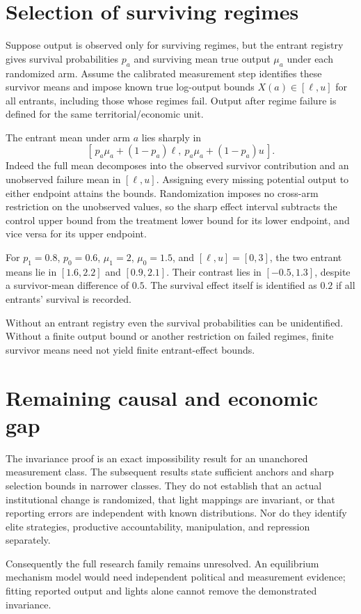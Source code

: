 \documentclass[11pt,a4paper]{article}
\begin{document}
\section{Selection of surviving regimes}
Suppose output is observed only for surviving regimes, but the entrant registry gives survival probabilities $p_a$ and surviving mean true output $\mu_a$ under each randomized arm. Assume the calibrated measurement step identifies these survivor means and impose known true log-output bounds $X(a)\in[\ell,u]$ for all entrants, including those whose regimes fail. Output after regime failure is defined for the same territorial/economic unit.

The entrant mean under arm $a$ lies sharply in
\[
 [\,p_a\mu_a+(1-p_a)\ell,\
    p_a\mu_a+(1-p_a)u\,].
 \tag{6}
\]
Indeed the full mean decomposes into the observed survivor contribution and an unobserved failure mean in $[\ell,u]$. Assigning every missing potential output to either endpoint attains the bounds. Randomization imposes no cross-arm restriction on the unobserved values, so the sharp effect interval subtracts the control upper bound from the treatment lower bound for its lower endpoint, and vice versa for its upper endpoint.

For $p_1=0.8$, $p_0=0.6$, $\mu_1=2$, $\mu_0=1.5$, and $[\ell,u]=[0,3]$, the two entrant means lie in $[1.6,2.2]$ and $[0.9,2.1]$. Their contrast lies in $[-0.5,1.3]$, despite a survivor-mean difference of $0.5$. The survival effect itself is identified as $0.2$ if all entrants' survival is recorded.

Without an entrant registry even the survival probabilities can be unidentified. Without a finite output bound or another restriction on failed regimes, finite survivor means need not yield finite entrant-effect bounds.
\section{Remaining causal and economic gap}
The invariance proof is an exact impossibility result for an unanchored measurement class. The subsequent results state sufficient anchors and sharp selection bounds in narrower classes. They do not establish that an actual institutional change is randomized, that light mappings are invariant, or that reporting errors are independent with known distributions. Nor do they identify elite strategies, productive accountability, manipulation, and repression separately.

Consequently the full research family remains unresolved. An equilibrium mechanism model would need independent political and measurement evidence; fitting reported output and lights alone cannot remove the demonstrated invariance.
\end{document}
